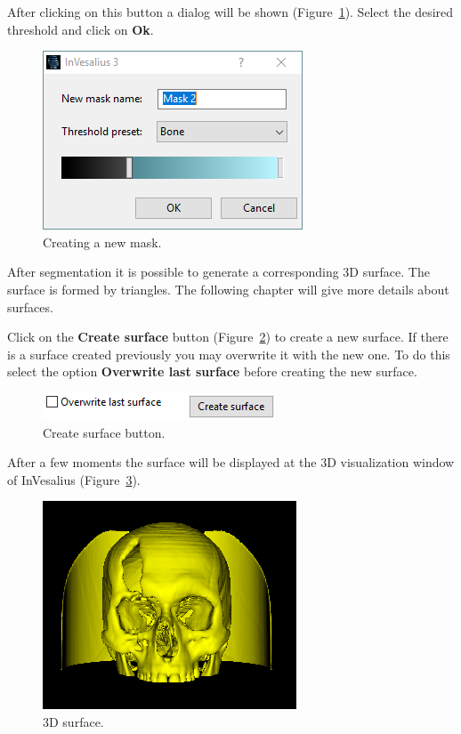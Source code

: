 After clicking on this button a dialog will be shown (Figure~\ref{fig:create_new_mask}). Select the desired threshold and click on \textbf{Ok}.

\begin{figure}[!htb]
\centering
\includegraphics[scale=0.55]{../user_guide_figures/invesalius_screen/segmentation_threshold_window_dialog_en.png}
\caption{Creating a new mask.}
\label{fig:create_new_mask}
\end{figure}

\newpage

After segmentation it is possible to generate a corresponding 3D surface. The surface is formed by triangles. The following chapter will give more details about surfaces.

Click on the \textbf{Create surface} button (Figure~\ref{fig:generate_surface}) to create a new surface. If there is a surface created previously you may overwrite it with the new one. To do this select the option \textbf{Overwrite last surface} before creating the new surface.

\begin{figure}[!htb]
\centering
\includegraphics[scale=0.55]{../user_guide_figures/invesalius_screen/segmentation_generate_surface_en.png}
\caption{Create surface button.}
\label{fig:generate_surface}
\end{figure}

After a few moments the surface will be displayed at the 3D visualization window of InVesalius (Figure~\ref{fig:surface}).

\begin{figure}[!htb]
\centering
\includegraphics[scale=0.5]{../user_guide_figures/invesalius_screen/surface_from_threshold.png}
\caption{3D surface.}
\label{fig:surface}
\end{figure}



